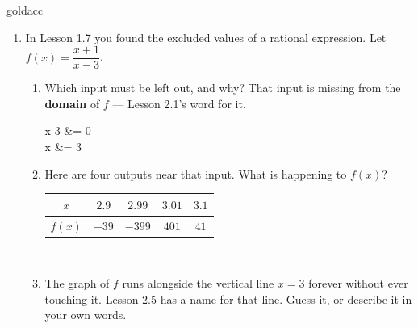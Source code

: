 \documentclass[10pt]{article}
\begin{document}
\boxguard[24]
\begin{scenariobox}{goldacc}
\small
\begin{enumerate}[leftmargin=1.6em, itemsep=6pt, topsep=2pt, start=9]

\item In Lesson 1.7 you found the excluded values of a rational expression. Let
$f(x)=\dfrac{x+1}{x-3}$.
\begin{enumerate}[label=(\alph*), leftmargin=1.6em, itemsep=5pt, topsep=4pt]
  \item Which input must be left out, and why? That input is missing from the
        \textbf{domain} of $f$ --- Lesson 2.1's word for it.
\begin{work}
  x-3 &= 0 \\
    x &= 3
\end{work}

  \item Here are four outputs near that input. What is happening to $f(x)$?
        \smallskip

        \renewcommand{\arraystretch}{1.25}
        \begin{tabular}{@{}|c|c|c|c|c|@{}}
        \hline
        $x$ & $2.9$ & $2.99$ & $3.01$ & $3.1$ \\ \hline
        $f(x)$ & $-39$ & $-399$ & $401$ & $41$ \\ \hline
        \end{tabular}
        \smallskip

\\

  \item The graph of $f$ runs alongside the vertical line $x=3$ forever without ever touching it.
        Lesson 2.5 has a name for that line. Guess it, or describe it in your own words.

\\
\end{enumerate}

\end{enumerate}
\end{scenariobox}

\vspace{0.10in}
\end{document}
